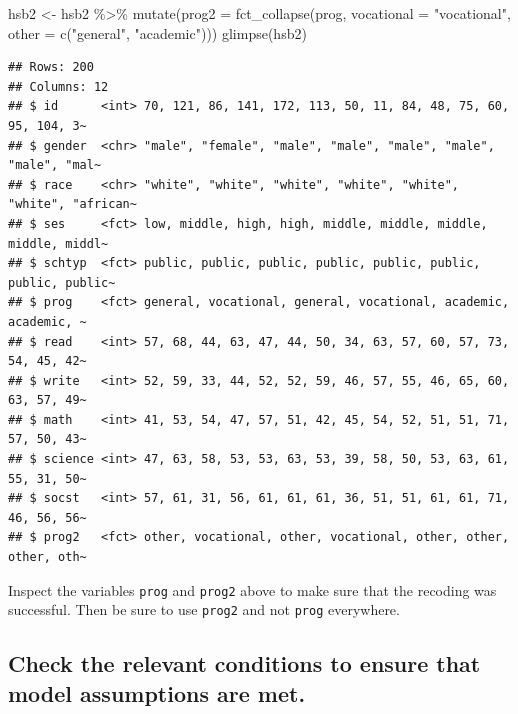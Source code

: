 \documentclass[
]{book}
\newenvironment{Shaded}{\begin{snugshade}}{\end{snugshade}}
\newcommand{\AttributeTok}[1]{\textcolor[rgb]{0.77,0.63,0.00}{#1}}
\newcommand{\FunctionTok}[1]{\textcolor[rgb]{0.00,0.00,0.00}{#1}}
\newcommand{\NormalTok}[1]{#1}
\newcommand{\OtherTok}[1]{\textcolor[rgb]{0.56,0.35,0.01}{#1}}
\newcommand{\SpecialCharTok}[1]{\textcolor[rgb]{0.00,0.00,0.00}{#1}}
\newcommand{\StringTok}[1]{\textcolor[rgb]{0.31,0.60,0.02}{#1}}
\begin{document}
\begin{Shaded}
\begin{Highlighting}[]
\NormalTok{hsb2 }\OtherTok{\textless{}{-}}\NormalTok{ hsb2 }\SpecialCharTok{\%\textgreater{}\%}
    \FunctionTok{mutate}\NormalTok{(}\AttributeTok{prog2 =} \FunctionTok{fct\_collapse}\NormalTok{(prog,}
                                \AttributeTok{vocational =} \StringTok{"vocational"}\NormalTok{,}
                                \AttributeTok{other =} \FunctionTok{c}\NormalTok{(}\StringTok{"general"}\NormalTok{, }\StringTok{"academic"}\NormalTok{)))}
\FunctionTok{glimpse}\NormalTok{(hsb2)}
\end{Highlighting}
\end{Shaded}

\begin{verbatim}
## Rows: 200
## Columns: 12
## $ id      <int> 70, 121, 86, 141, 172, 113, 50, 11, 84, 48, 75, 60, 95, 104, 3~
## $ gender  <chr> "male", "female", "male", "male", "male", "male", "male", "mal~
## $ race    <chr> "white", "white", "white", "white", "white", "white", "african~
## $ ses     <fct> low, middle, high, high, middle, middle, middle, middle, middl~
## $ schtyp  <fct> public, public, public, public, public, public, public, public~
## $ prog    <fct> general, vocational, general, vocational, academic, academic, ~
## $ read    <int> 57, 68, 44, 63, 47, 44, 50, 34, 63, 57, 60, 57, 73, 54, 45, 42~
## $ write   <int> 52, 59, 33, 44, 52, 52, 59, 46, 57, 55, 46, 65, 60, 63, 57, 49~
## $ math    <int> 41, 53, 54, 47, 57, 51, 42, 45, 54, 52, 51, 51, 71, 57, 50, 43~
## $ science <int> 47, 63, 58, 53, 53, 63, 53, 39, 58, 50, 53, 63, 61, 55, 31, 50~
## $ socst   <int> 57, 61, 31, 56, 61, 61, 61, 36, 51, 51, 61, 61, 71, 46, 56, 56~
## $ prog2   <fct> other, vocational, other, vocational, other, other, other, oth~
\end{verbatim}

Inspect the variables \texttt{prog} and \texttt{prog2} above to make sure that the recoding was successful. Then be sure to use \texttt{prog2} and not \texttt{prog} everywhere.

\hypertarget{ci-ex-conditions}{%
\subsection{Check the relevant conditions to ensure that model assumptions are met.}\label{ci-ex-conditions}}
\end{document}
